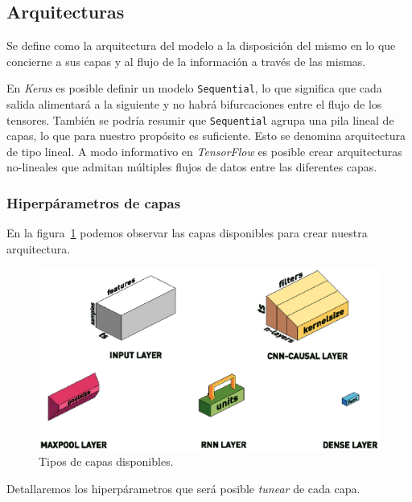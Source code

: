 \documentclass[a4paper,12pt]{article}
\begin{document}
\subsection{Arquitecturas} \label{archs}
Se define como la arquitectura del modelo a la disposición del mismo en lo que concierne a sus capas y al flujo de la información a través de las mismas.

En \textit{Keras} es posible definir un modelo \texttt{Sequential}, lo que significa que cada salida alimentará a la siguiente y no habrá bifurcaciones entre el flujo de los tensores. También se podría resumir que \texttt{Sequential} agrupa una pila lineal de capas, lo que para nuestro propósito es suficiente. Esto se denomina arquitectura de tipo lineal. A modo informativo en \textit{TensorFlow} es posible crear arquitecturas no-lineales que admitan múltiples flujos de datos entre las diferentes capas.

\subsubsection{Hiperpárametros de capas}
En la figura~\ref{fig:layer_types} podemos observar las capas disponibles para crear nuestra arquitectura.

\begin{figure}[H]
	\begin{center}
	\includegraphics{model_types.eps}
  	\caption{Tipos de capas disponibles.}
  	\label{fig:layer_types}
  	\end{center}
\end{figure}

Detallaremos los hiperpárametros que será posible \textit{tunear} de cada capa.
\end{document}
